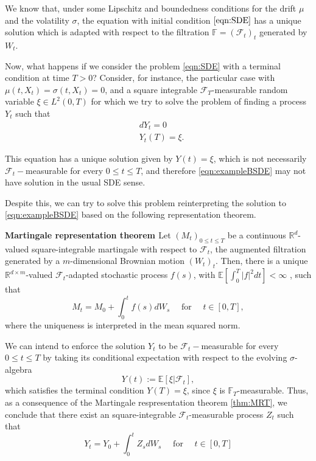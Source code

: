 We know that, under some Lipschitz and boundedness conditions for the drift $\mu$ and the volatility $\sigma$, the equation with initial condition $\eqref{eqn:SDE}$ has a unique solution which is adapted with respect to the filtration $\mathbb{F}=(\mathcal{F}_t)_t$ generated by $W_t$.

Now, what happens if we consider the problem \eqref{eqn:SDE} with a terminal condition at time $T>0$? Consider, for instance, the particular case with $\mu(t,X_t)=\sigma(t,X_t)=0$, and a square integrable $\mathcal{F}_T$-measurable random variable $\xi\in L^2(0,T)$ for which we try to solve the problem of finding a process $Y_t$ such that
\begin{equation}
	\label{eqn:exampleBSDE}
	\begin{split}
		&dY_t=0\\
		&Y_t(T)=\xi.
	\end{split}
\end{equation}

This equation has a unique solution given by $Y(t)=\xi$, which is not necessarily $\mathcal{F}_t-$measurable for every $0\leq t \leq T$, and therefore \eqref{eqn:exampleBSDE} may not have solution in the usual SDE sense. 

Despite this, we can try to solve this problem reinterpreting the solution to \eqref{eqn:exampleBSDE} based on the following representation theorem.
\begin{theorem}
	\label{thm:MRT}
	\textbf{ Martingale representation theorem \cite{mao_stochastic_2008} } Let $(M_t)_{0\leq t \leq T}$ be a continuous $\mathbb{R}^d$-valued square-integrable martingale with respect to $\mathcal{F}_t$, the augmented filtration generated by a $m$-dimensional Brownian motion $(W_t)_t$. Then, there is a unique $\mathbb{R}^{d\times m}$-valued $\mathcal{F}_t$-adapted stochastic process $f(s)$, with $\mathbb{E}[\int_{0}^{T}|f|^2dt]<\infty$ , such that 
	\begin{equation}
		M_t=M_0+\int_{0}^{t}f(s)dW_s \quad \text{ for } \quad t\in [0,T],
	\end{equation}
	where the uniqueness is interpreted in the mean squared norm.
\end{theorem}

We can intend to enforce the solution $Y_t$ to be $\mathcal{F}_t-$measurable for every $0 \leq t \leq T $ by taking its conditional expectation with respect to the evolving $\sigma$-algebra
\begin{equation}
	Y(t):=\mathbb{E}[\xi|\mathcal{F}_t],
\end{equation}
which satisfies the terminal condition $Y(T)=\xi$, since $\xi$ is $\mathbb{F}_T$-measurable. Thus, as a consequence of the Martingale respresentation theorem \ref{thm:MRT}, we conclude that there exist an square-integrable $\mathcal{F}_t$-measurable process $Z_t$ such that 
\begin{equation}
	Y_t=Y_0+\int_{0}^{t}Z_sdW_s\quad \text{ for } \quad t\in [0,T]
\end{equation}
